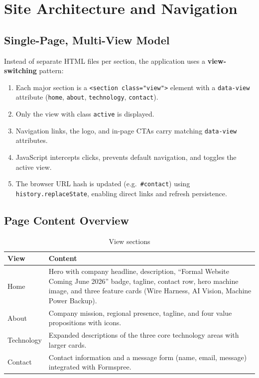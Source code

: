 \documentclass[11pt,a4paper]{article}
\begin{document}
\section{Site Architecture and Navigation}

\subsection{Single-Page, Multi-View Model}

Instead of separate HTML files per section, the application uses a
\textbf{view-switching} pattern:

\begin{enumerate}[noitemsep]
  \item Each major section is a \texttt{<section class="view">} element with a
        \texttt{data-view} attribute (\texttt{home}, \texttt{about},
        \texttt{technology}, \texttt{contact}).
  \item Only the view with class \texttt{active} is displayed.
  \item Navigation links, the logo, and in-page CTAs carry matching
        \texttt{data-view} attributes.
  \item JavaScript intercepts clicks, prevents default navigation, and toggles
        the active view.
  \item The browser URL hash is updated (e.g.\ \texttt{\#contact}) using
        \texttt{history.replaceState}, enabling direct links and refresh
        persistence.
\end{enumerate}

\subsection{Page Content Overview}

\begin{table}[h]
  \centering
  \small
  \begin{tabular}{@{}p{2.2cm}p{10cm}@{}}
    \toprule
    \textbf{View} & \textbf{Content} \\
    \midrule
    Home &
    Hero with company headline, description, ``Formal Website Coming June 2026''
    badge, tagline, contact row, hero machine image, and three feature cards
    (Wire Harness, AI Vision, Machine Power Backup). \\
    About &
    Company mission, regional presence, tagline, and four value propositions
    with icons. \\
    Technology &
    Expanded descriptions of the three core technology areas with larger cards. \\
    Contact &
    Contact information and a message form (name, email, message) integrated
    with Formspree. \\
    \bottomrule
  \end{tabular}
  \caption{View sections}
\end{table}
\end{document}
